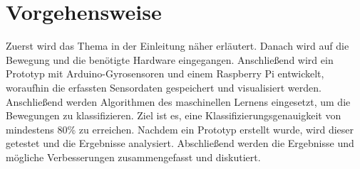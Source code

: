 \section{Vorgehensweise}
Zuerst wird das Thema in der Einleitung näher erläutert. Danach wird auf die Bewegung und die benötigte Hardware eingegangen.  Anschließend wird ein Prototyp mit Arduino-Gyrosensoren und einem Raspberry Pi entwickelt, woraufhin die erfassten Sensordaten gespeichert und visualisiert werden. Anschließend werden Algorithmen des maschinellen Lernens eingesetzt, um die Bewegungen zu klassifizieren. Ziel ist es, eine Klassifizierungsgenauigkeit von mindestens 80\% zu erreichen. Nachdem ein Prototyp erstellt wurde, wird dieser getestet und die Ergebnisse analysiert. Abschließend werden die Ergebnisse und mögliche Verbesserungen zusammengefasst und diskutiert.
